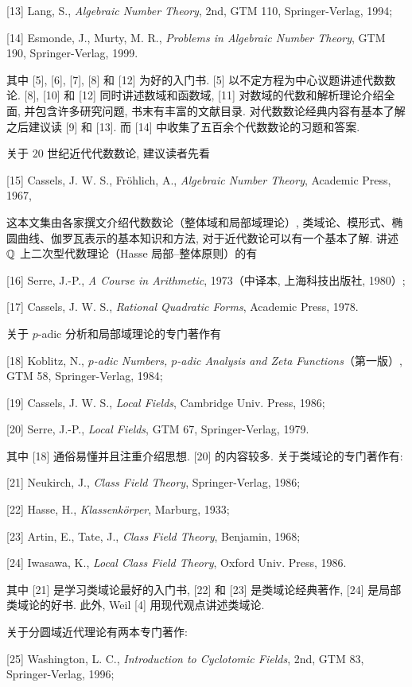 [13] Lang, S., \emph{Algebraic Number Theory}, 2nd, GTM 110, Springer-Verlag, 1994;

[14] Esmonde, J., Murty, M. R., \emph{Problems in Algebraic Number Theory}, GTM 190, Springer-Verlag, 1999.

其中 [5], [6], [7], [8] 和 [12] 为好的入门书. [5] 以不定方程为中心议题讲述代数数论. [8], [10] 和 [12] 同时讲述数域和函数域, [11] 对数域的代数和解析理论介绍全面, 并包含许多研究问题, 书末有丰富的文献目录. 对代数数论经典内容有基本了解之后建议读 [9] 和 [13]. 而 [14] 中收集了五百余个代数数论的习题和答案.

关于 $20$ 世纪近代代数数论, 建议读者先看

[15] Cassels, J. W. S., Fr\"ohlich, A., \emph{Algebraic Number Theory}, Academic Press, 1967,

这本文集由各家撰文介绍代数数论（整体域和局部域理论）, 类域论、模形式、椭圆曲线、伽罗瓦表示的基本知识和方法, 对于近代数论可以有一个基本了解. 讲述 $\mathbb{Q}$ 上二次型代数理论（Hasse 局部--整体原则）的有

[16] Serre, J.-P., \emph{A Course in Arithmetic}, 1973（中译本, 上海科技出版社, 1980）;

[17] Cassels, J. W. S., \emph{Rational Quadratic Forms}, Academic Press, 1978.

关于 $p$-adic 分析和局部域理论的专门著作有

[18] Koblitz, N., \emph{$p$-adic Numbers, $p$-adic Analysis and Zeta Functions}（第一版）, GTM 58, Springer-Verlag, 1984;

[19] Cassels, J. W. S., \emph{Local Fields}, Cambridge Univ. Press, 1986;

[20] Serre, J.-P., \emph{Local Fields}, GTM 67, Springer-Verlag, 1979.

其中 [18] 通俗易懂并且注重介绍思想. [20] 的内容较多. 关于类域论的专门著作有:

[21] Neukirch, J., \emph{Class Field Theory}, Springer-Verlag, 1986;

[22] Hasse, H., \emph{Klassenk\"orper}, Marburg, 1933;

[23] Artin, E., Tate, J., \emph{Class Field Theory}, Benjamin, 1968;

[24] Iwasawa, K., \emph{Local Class Field Theory}, Oxford Univ. Press, 1986.

其中 [21] 是学习类域论最好的入门书, [22] 和 [23] 是类域论经典著作, [24] 是局部类域论的好书. 此外, Weil [4] 用现代观点讲述类域论.

关于分圆域近代理论有两本专门著作:

[25] Washington, L. C., \emph{Introduction to Cyclotomic Fields}, 2nd, GTM 83, Springer-Verlag, 1996;

